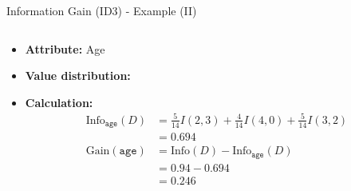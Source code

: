 \begin{frame}{Information Gain (ID3) - Example (II)}
	\begin{columns}
		\begin{column}{0.45\textwidth}
			\vspace*{-2em}
			\begin{itemize}
				\item \textbf{Attribute:} Age \medskip
				\item \textbf{Value distribution:}
				      \vspace*{0.1cm}
				      \begin{center}
					      \medskip
				      \end{center}
				\item \textbf{Calculation:}
				      {
					      \footnotesize
					      \begin{align*}
						      \text{Info}_{\texttt{age}}(D) & = \frac{5}{14}I(2,3) + \frac{4}{14} I(4,0) + \frac{5}{14} I(3,2) \\
						                                    & = 0.694                                                          \\
						      \text{Gain}(\texttt{age})     & = \text{Info}(D)-\text{Info}_{\texttt{age}}(D)                   \\
						                                    & = 0.94 - 0.694                                                   \\
						                                    & = 0.246
					      \end{align*}
				      }
			\end{itemize}



\end{column}
\end{columns}
\end{frame}
